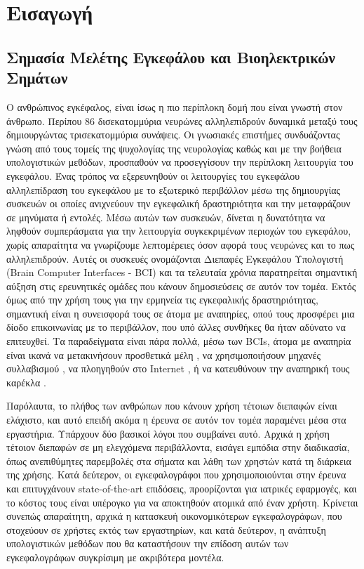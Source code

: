 \documentclass[11pt,a4paper,english,greek,twoside]{../Thesis}
\begin{document}
\chapter{Εισαγωγή}
\section{Σημασία Μελέτης Εγκεφάλου και Βιοηλεκτρικών Σημάτων}
Ο ανθρώπινος εγκέφαλος, είναι ίσως η πιο περίπλοκη δομή που είναι γνωστή στον άνθρωπο. Περίπου 86 δισεκατομμύρια νευρώνες \cite{Herculano-Houzel2009TheBrain} αλληλεπιδρούν δυναμικά μεταξύ τους δημιουργώντας τρισεκατομμύρια συνάψεις. Οι γνωσιακές επιστήμες συνδυάζοντας γνώση από τους τομείς της ψυχολογίας της νευρολογίας καθώς και με την βοήθεια υπολογιστικών μεθόδων, προσπαθούν να προσεγγίσουν την περίπλοκη λειτουργία του εγκεφάλου. Ένας τρόπος να εξερευνηθούν οι λειτουργίες του εγκεφάλου αλληλεπίδραση του εγκεφάλου με το εξωτερικό περιβάλλον μέσω της δημιουργίας συσκευών οι οποίες ανιχνεύουν την εγκεφαλική δραστηριότητα και την μεταφράζουν σε μηνύματα ή εντολές. Μέσω αυτών των συσκευών, δίνεται η δυνατότητα να ληφθούν συμπεράσματα για την λειτουργία συγκεκριμένων περιοχών του εγκεφάλου, χωρίς απαραίτητα να γνωρίζουμε λεπτομέρειες όσον αφορά τους νευρώνες και το πως αλληλεπιδρούν. Αυτές οι συσκευές ονομάζονται Διεπαφές Εγκεφάλου Υπολογιστή (Brain Computer Interfaces - BCI) και τα τελευταία χρόνια παρατηρείται σημαντική αύξηση στις ερευνητικές ομάδες που κάνουν δημοσιεύσεις σε αυτόν τον τομέα. Εκτός όμως από την χρήση τους για την ερμηνεία τις εγκεφαλικής δραστηριότητας, σημαντική είναι η συνεισφορά τους σε άτομα με αναπηρίες, οπού τους προσφέρει μια δίοδο επικοινωνίας με το περιβάλλον, που υπό άλλες συνθήκες θα ήταν αδύνατο να επιτευχθεί. Τα παραδείγματα είναι πάρα πολλά, μέσω των BCIs, άτομα με αναπηρία είναι ικανά να μετακινήσουν προσθετικά μέλη \cite{}, να χρησιμοποιήσουν μηχανές συλλαβισμού \cite{Farwell1988TalkingPotentials}, να πλοηγηθούν στο Internet \cite{}, ή να κατευθύνουν την αναπηρική τους καρέκλα \cite{}.
\par Παρόλαυτα, το πλήθος των ανθρώπων που κάνουν χρήση τέτοιων διεπαφών είναι ελάχιστο, και αυτό επειδή ακόμα η έρευνα σε αυτόν τον τομέα παραμένει μέσα στα εργαστήρια. Υπάρχουν δύο βασικοί λόγοι που συμβαίνει αυτό. Αρχικά η χρήση τέτοιον διεπαφών σε μη ελεγχόμενα περιβάλλοντα, εισάγει εμπόδια στην διαδικασία, όπως ανεπιθύμητες παρεμβολές στα σήματα και λάθη των χρηστών κατά τη διάρκεια της χρήσης. Κατά δεύτερον, οι εγκεφαλογράφοι που χρησιμοποιούνται στην έρευνα και επιτυγχάνουν state-of-the-art επιδόσεις, προορίζονται για ιατρικές εφαρμογές, και το κόστος τους είναι υπέρογκο για να αποκτηθούν ατομικά από έναν χρήστη. Κρίνεται συνεπώς απαραίτητη, αρχικά η κατασκευή οικονομικότερων εγκεφαλογράφων, που στοχεύουν σε χρήστες εκτός των εργαστηρίων, και κατά δεύτερον, η ανάπτυξη υπολογιστικών μεθόδων που θα καταστήσουν την επίδοση αυτών των εγκεφαλογράφων συγκρίσιμη με ακριβότερα μοντέλα. 
\end{document}
